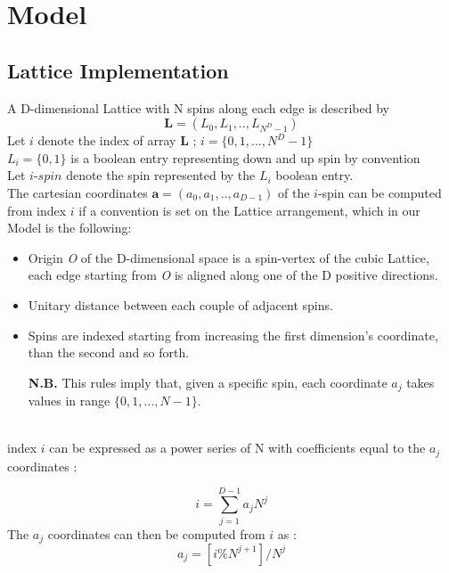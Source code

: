 \documentclass[11pt,a4paper]{article}
\begin{document}
\newpage


\section{Model}

\subsection{Lattice Implementation}

A D-dimensional Lattice with N spins along each edge is described by 
$$\mathbf{L} = (L_0,L_1,..,L_{N^D-1})$$
Let $i$ denote the index of array $\mathbf{L}$ ; $i = \{0,1,...,N^D -1\}$\\
$L_i = \{0,1\}$ is a boolean entry representing down and up spin by convention \\
Let $i$-$spin$ denote the spin represented by the $L_i$ boolean entry. \\
The cartesian coordinates $\mathbf{a} = (a_0,a_1,..,a_{D-1})$ of the $i$-spin can be computed from index $i$ if a convention is set on the Lattice arrangement, which in our Model is the following:
\begin{itemize}
\item Origin \textit{O} of the D-dimensional space is a spin-vertex of the cubic Lattice, each edge starting from \textit{O} is aligned along one of the D positive directions.
\item Unitary distance between each couple of adjacent spins.
\item Spins are indexed starting from increasing the first dimension’s coordinate, than the second and so forth.
\item[\textbf{N.B.}] This rules imply that, given a specific spin, each coordinate $a_j$ takes values in range $\{0,1,…,N-1\}$. \\ \\
\end{itemize}
index $i$ can be expressed as a power series of N with coefficients equal to the $a_j$ coordinates :

\begin{equation}
i = \sum_{j=1}^{D-1}a_jN^j
\end{equation}
The $a_j$ coordinates can then be computed from $i$ as :
\begin{equation}
a_j = [i\%N^{j+1}]/N^j
\end{equation}

\end{document}
